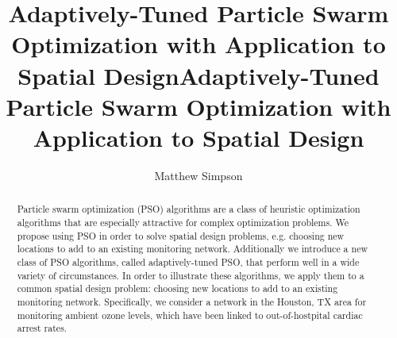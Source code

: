 \documentclass[cmbright]{staauth}
\begin{document}
\blind
{
  \title{Adaptively-Tuned Particle Swarm Optimization with Application to Spatial Design}
  \author{Matthew Simpson\corrauth}
  \address{Department of Statistics, University of Missouri,\\
    146 Middlebush Hall, Columbia, MO 65211-6100}
}\fi

\blind
{
  \title{Adaptively-Tuned Particle Swarm Optimization with Application to Spatial Design}
  \author{}
  \address{}
  \corremail{}
  \received{}
  \accepted{}
}\fi
\begin{abstract}
Particle swarm optimization (PSO) algorithms are a class of heuristic optimization algorithms that are especially attractive for complex optimization problems. We propose using PSO in order to solve spatial design problems, e.g. choosing new locations to add to an existing monitoring network. Additionally we introduce a new class of PSO algorithms, called adaptively-tuned PSO, that perform well in a wide variety of circumstances. In order to illustrate these algorithms, we apply them to a common spatial design problem: choosing new locations to add to an existing monitoring network. Specifically, we consider a network in the Houston, TX area for monitoring ambient ozone levels, which have been linked to out-of-hostpital cardiac arrest rates.
\end{abstract}
\maketitle
\end{document}
